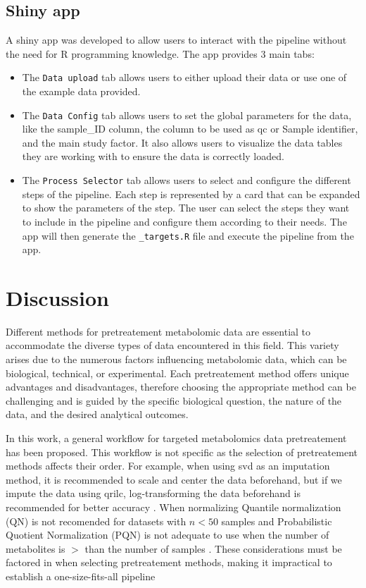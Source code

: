 \documentclass[ENG, BIB]{TFUOC}%
\begin{document}
\section{Shiny app}

A shiny app was developed to allow users to interact with the pipeline without the need for R programming knowledge. The app provides 3 main tabs:
\begin{itemize}
    \item The \texttt{Data upload} tab allows users to either upload their data or use one of the example data provided.
    \item The \texttt{Data Config} tab allows users to set the global parameters for the data, like the sample\_ID column, the column to be used as \gls{qc} or Sample identifier, and the main study factor. It also allows users to visualize the data tables they are working with to ensure the data is correctly loaded.
    \item The \texttt{Process Selector} tab allows users to select and configure the different steps of the pipeline. Each step is represented by a card that can be expanded to show the parameters of the step. The user can select the steps they want to include in the pipeline and configure them according to their needs. The app will then generate the \texttt{\_targets.R} file and execute the pipeline from the app.
\end{itemize}

\chapter{Discussion}
Different methods for pretreatement metabolomic data are essential to accommodate the diverse types of data encountered in this field. This variety arises due to the numerous factors influencing metabolomic data, which can be biological, technical, or experimental. Each pretreatement method offers unique advantages and disadvantages, therefore choosing the appropriate method can be challenging and is guided by the specific biological question, the nature of the data, and the desired analytical outcomes.

In this work, a general workflow for targeted metabolomics data pretreatement has been proposed. This workflow is not specific as the selection of pretreatement methods affects their order. For example, when using \gls{svd} as an imputation method, it is recommended to scale and center the data beforehand, but if we impute the data using \gls{qrilc}, log-transforming the data beforehand is recommended for better accuracy \cite{weiMissingValueImputation2018}. When normalizing Quantile normalization (QN) is not recomended for datasets with $n < 50$ samples \cite{kohlStateoftheArtData2012} and Probabilistic Quotient Normalization (PQN) is not adequate to use when the number of metabolites is $>$ than the number of samples \cite{dongGroupAggregatingNormalization2011}.
These considerations must be factored in when selecting pretreatement methods, making it impractical to establish a one-size-fits-all pipeline
\end{document}
